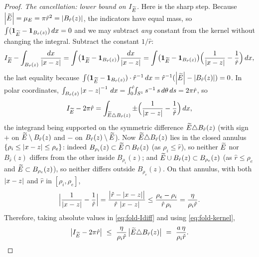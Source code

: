 \begin{proof}
\emph{The cancellation: lower bound on $I_{\widetilde{E}}$.}
Here is the sharp step. Because $\left\lvert\widetilde{E}\right\rvert=\mu_E=\pi\hat r^2
=\left\lvert B_{\hat r}(z)\right\rvert$, the indicators have equal mass, so
$\int(\mathbf1_{\widetilde{E}}-\mathbf1_{B_{\hat r}(z)})\,dx=0$ and we may subtract
\emph{any} constant from the kernel without changing the integral. Subtract
the constant $1/\hat r$:
\[
   I_{\widetilde{E}}-\int_{B_{\hat r}(z)}\frac{dx}{\left\lvert x-z\right\rvert}
   =\int\bigl(\mathbf1_{\widetilde{E}}-\mathbf1_{B_{\hat r}(z)}\bigr)
        \frac{dx}{\left\lvert x-z\right\rvert}
   =\int\bigl(\mathbf1_{\widetilde{E}}-\mathbf1_{B_{\hat r}(z)}\bigr)
        \Bigl(\frac1{\left\lvert x-z\right\rvert}-\frac1{\hat r}\Bigr)\,dx,
\]
the last equality because $\int(\mathbf1_{\widetilde{E}}-\mathbf1_{B_{\hat r}(z)})
\cdot\hat r^{-1}\,dx=\hat r^{-1}(\left\lvert\widetilde{E}\right\rvert-\left\lvert B_{\hat r}(z)\right\rvert)=0$. In polar
coordinates,
$\int_{B_{\hat r}(z)}\left\lvert x-z\right\rvert^{-1}\,dx
=\int_0^{\hat r}\!\!\int_{S^1}s^{-1}\,s\,d\theta\,ds=2\pi\hat r$, so
\begin{equation}\label{eq:fold-Idiff}
   I_{\widetilde{E}}-2\pi\hat r
   =\int_{\widetilde{E}\triangle B_{\hat r}(z)}
       \pm\Bigl(\frac1{\left\lvert x-z\right\rvert}-\frac1{\hat r}\Bigr)\,dx,
\end{equation}
the integrand being supported on the symmetric difference
$\widetilde{E}\triangle B_{\hat r}(z)$ (with sign $+$ on $\widetilde{E}\setminus
B_{\hat r}(z)$ and $-$ on $B_{\hat r}(z)\setminus\widetilde{E}$). Now
$\widetilde{E}\triangle B_{\hat r}(z)$ lies in the closed annulus
$\{\rho_i\le\left\lvert x-z\right\rvert\le\rho_e\}$: indeed
$B_{\rho_i}(z)\subset\widetilde{E}\cap B_{\hat r}(z)$ (as $\rho_i\le\hat r$), so
neither $\widetilde{E}$ nor $B_{\hat r}(z)$ differs from the other inside
$B_{\rho_i}(z)$; and $\widetilde{E}\cup B_{\hat r}(z)\subset B_{\rho_e}(z)$ (as
$\hat r\le\rho_e$ and $\widetilde{E}\subset B_{\rho_e}(z)$), so neither differs
outside $B_{\rho_e}(z)$. On that annulus, with both $\left\lvert x-z\right\rvert$ and
$\hat r$ in $[\rho_i,\rho_e]$,
\begin{equation}\label{eq:fold-kernel}
   \Bigl|\frac1{\left\lvert x-z\right\rvert}-\frac1{\hat r}\Bigr|
   =\frac{\bigl|\hat r-\left\lvert x-z\right\rvert\bigr|}{\hat r\,\left\lvert x-z\right\rvert}
   \le\frac{\rho_e-\rho_i}{\hat r\,\rho_i}=\frac{\eta}{\rho_i\hat r}.
\end{equation}
Therefore, taking absolute values in \eqref{eq:fold-Idiff} and using
\eqref{eq:fold-kernel},
\begin{equation}\label{eq:Icancel}
   \bigl|I_{\widetilde{E}}-2\pi\hat r\bigr|
   \ \le\ \frac{\eta}{\rho_i\hat r}\,
          \bigl|\widetilde{E}\triangle B_{\hat r}(z)\bigr|
   \ =\ \frac{a\,\eta}{\rho_i\hat r}.
\end{equation}


\end{proof}
